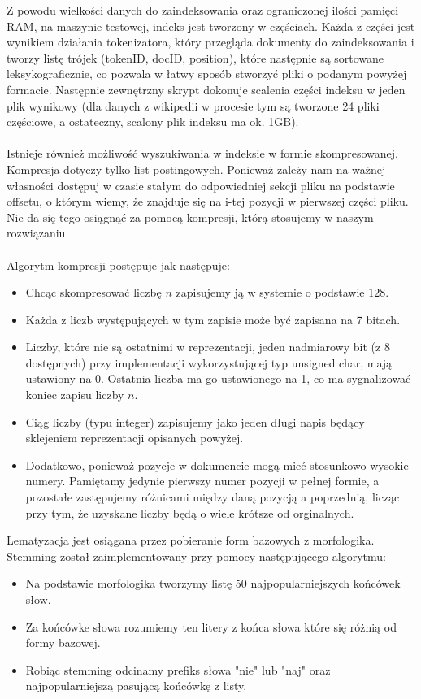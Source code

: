\documentclass[11pt,leqno]{article}
\begin{document}
Z powodu wielkości danych do zaindeksowania oraz ograniczonej ilości pamięci RAM, na maszynie testowej, indeks jest tworzony w częściach. Każda z części jest wynikiem działania tokenizatora, który przegląda dokumenty do zaindeksowania i tworzy listę trójek (tokenID, docID, position), które następnie są sortowane leksykograficznie, co pozwala w łatwy sposób stworzyć pliki o podanym powyżej formacie. Następnie zewnętrzny skrypt dokonuje scalenia części indeksu w jeden plik wynikowy (dla danych z wikipedii w procesie tym są tworzone 24 pliki częściowe, a ostateczny, scalony plik indeksu ma ok. 1GB).\\\\
Istnieje również możliwość wyszukiwania w indeksie w formie skompresowanej. Kompresja dotyczy tylko list postingowych. Ponieważ zależy nam na ważnej własności dostępuj w czasie stałym do odpowiedniej sekcji pliku na podstawie offsetu, o którym wiemy, że znajduje się na i-tej pozycji w pierwszej części pliku. Nie da się tego osiągnąć za pomocą kompresji, którą stosujemy w naszym rozwiązaniu.\\\\
Algorytm kompresji postępuje jak następuje:
\begin{itemize}
\item Chcąc skompresować liczbę $n$ zapisujemy ją w systemie o podstawie $128$.
\item Każda z liczb występujących w tym zapisie może być zapisana na 7 bitach.
\item Liczby, które nie są ostatnimi w reprezentacji, jeden nadmiarowy bit (z 8 dostępnych) przy implementacji wykorzystującej typ unsigned char, mają ustawiony na 0. Ostatnia liczba ma go ustawionego na 1, co ma sygnalizować koniec zapisu liczby $n$.
\item Ciąg liczby (typu integer) zapisujemy jako jeden długi napis będący sklejeniem reprezentacji opisanych powyżej.
\item Dodatkowo, ponieważ pozycje w dokumencie mogą mieć stosunkowo wysokie numery. Pamiętamy jedynie pierwszy numer pozycji w pełnej formie, a pozostałe zastępujemy różnicami między daną pozycją a poprzednią, licząc przy tym, że uzyskane liczby będą o wiele krótsze od orginalnych.
\end{itemize} 

Lematyzacja jest osiągana przez pobieranie form bazowych z morfologika. Stemming został zaimplementowany przy pomocy następującego algorytmu:


\begin{itemize}
\item Na podstawie morfologika tworzymy listę 50 najpopularniejszych końcówek słow.
\item Za końcówke słowa rozumiemy ten litery z końca słowa które się różnią od formy bazowej.
\item Robiąc stemming odcinamy prefiks słowa "nie" lub "naj" oraz najpopularniejszą pasującą końcówkę z listy.
\end{itemize}
\end{document}
